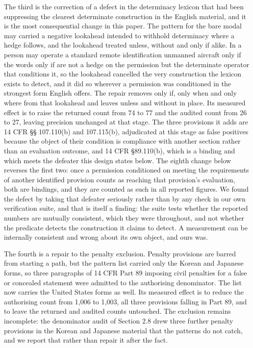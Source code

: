 The third is the correction of a defect in the determinacy lexicon that had been suppressing the clearest determinate construction in the English material, and it is the most consequential change in this paper. The pattern for the bare modal may carried a negative lookahead intended to withhold determinacy where a hedge follows, and the lookahead treated unless, without and only if alike. In a person may operate a standard remote identification unmanned aircraft only if the words only if are not a hedge on the permission but the determinate operator that conditions it, so the lookahead cancelled the very construction the lexicon exists to detect, and it did so wherever a permission was conditioned in the strongest form English offers. The repair removes only if, only when and only where from that lookahead and leaves unless and without in place. Its measured effect is to raise the returned count from 74 to 77 and the audited count from 26 to 27, leaving precision unchanged at that stage. The three provisions it adds are 14 CFR \S{}\S{} 107.110(b) and 107.115(b), adjudicated at this stage as false positives because the object of their condition is compliance with another section rather than an evaluation outcome, and 14 CFR \S{}89.110(b), which is a binding and which meets the defeater this design states below. The eighth change below reverses the first two: once a permission conditioned on meeting the requirements of another identified provision counts as reaching that provision's evaluation, both are bindings, and they are counted as such in all reported figures. We found the defect by taking that defeater seriously rather than by any check in our own verification suite, and that is itself a finding: the suite tests whether the reported numbers are mutually consistent, which they were throughout, and not whether the predicate detects the construction it claims to detect. A measurement can be internally consistent and wrong about its own object, and ours was.

The fourth is a repair to the penalty exclusion. Penalty provisions are barred from starting a path, but the pattern list carried only the Korean and Japanese forms, so three paragraphs of 14 CFR Part 89 imposing civil penalties for a false or concealed statement were admitted to the authorising denominator. The list now carries the United States forms as well. Its measured effect is to reduce the authorising count from 1,006 to 1,003, all three provisions falling in Part 89, and to leave the returned and audited counts untouched. The exclusion remains incomplete: the denominator audit of Section 2.8 drew three further penalty provisions in the Korean and Japanese material that the patterns do not catch, and we report that rather than repair it after the fact.

